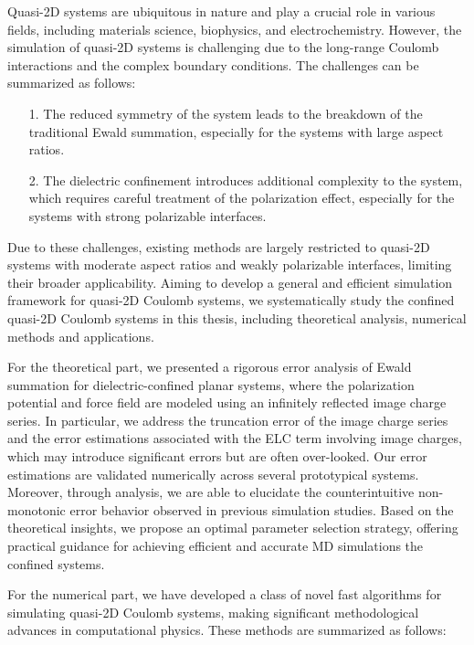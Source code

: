 Quasi-2D systems are ubiquitous in nature and play a crucial role in various fields, including materials science, biophysics, and electrochemistry. 
However, the simulation of quasi-2D systems is challenging due to the long-range Coulomb interactions and the complex boundary conditions.
The challenges can be summarized as follows:
\begin{itemize}
    \item[1.] The reduced symmetry of the system leads to the breakdown of the traditional Ewald summation, especially for the systems with large aspect ratios.
    \item[2.] The dielectric confinement introduces additional complexity to the system, which requires careful treatment of the polarization effect, especially for the systems with strong polarizable interfaces.
\end{itemize}
Due to these challenges, existing methods are largely restricted to quasi-2D systems with moderate aspect ratios and weakly polarizable interfaces, limiting their broader applicability.
Aiming to develop a general and efficient simulation framework for quasi-2D Coulomb systems, we systematically study the confined quasi-2D Coulomb systems in this thesis, including theoretical analysis, numerical methods and applications.

For the theoretical part, we presented a rigorous error analysis of Ewald summation for dielectric-confined planar systems, where the polarization potential and force field are modeled using an infinitely reflected image charge series. 
In particular, we address the truncation error of the image charge series and the error estimations associated with the ELC term involving image charges, which may introduce significant errors but are often over-looked.
Our error estimations are validated numerically across several prototypical systems. Moreover, through analysis, we are able to elucidate the counterintuitive non-monotonic error behavior observed in previous simulation studies.
Based on the theoretical insights, we propose an optimal parameter selection strategy, offering practical guidance for achieving efficient and accurate MD simulations the confined systems.

For the numerical part, we have developed a class of novel fast algorithms for simulating quasi-2D Coulomb systems, making significant methodological advances in computational physics. 
These methods are summarized as follows:

